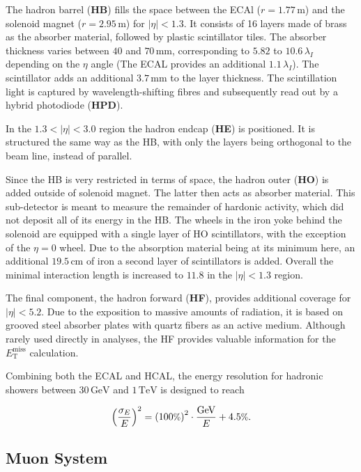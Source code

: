 The hadron barrel (\textbf{HB}) fills the space between the ECAl ($r = 1.77\,\text{m}$) and the solenoid magnet ($r = 2.95\,\text{m}$) for $|\eta| < 1.3$. It consists of 16 layers made of brass as the absorber material, followed by plastic scintillator tiles. The absorber thickness varies between $40$ and $70\,\text{mm}$, corresponding to $5.82$ to $10.6\,\lambda_I$ depending on the $\eta$ angle (The ECAL provides an additional $1.1\,\lambda_I$). The scintillator adds an additional $3.7\,\text{mm}$ to the layer thickness. The scintillation light is captured by wavelength-shifting fibres and subsequently read out by a hybrid photodiode (\textbf{HPD}).

In the $1.3 < |\eta| < 3.0$ region the hadron endcap (\textbf{HE}) is positioned. It is structured the same way as the HB, with only the layers being orthogonal to the beam line, instead of parallel.

Since the HB is very restricted in terms of space, the hadron outer (\textbf{HO}) is added outside of solenoid magnet. The latter then acts as absorber material. This sub-detector is meant to measure the remainder of hardonic activity, which did not deposit all of its energy in the HB. The wheels in the iron yoke behind the solenoid are equipped with a single layer of HO scintillators, with the exception of the $\eta = 0$ wheel. Due to the absorption material being at its minimum here, an additional $19.5\,\text{cm}$ of iron a second layer of scintillators is added. Overall the minimal interaction length is increased to $11.8$ in the $|\eta| < 1.3$ region.

The final component, the hadron forward (\textbf{HF}), provides additional coverage for $|\eta| < 5.2$. Due to the exposition to massive amounts of radiation, it is based on grooved steel absorber plates with quartz fibers as an active medium. Although rarely used directly in analyses, the HF provides valuable information for the $E^{\text{miss}}_{\text{T}}$ calculation.

Combining both the ECAL and HCAL, the energy resolution for hadronic showers between $30\,\text{GeV}$ and $1\,\text{TeV}$ is designed to reach~\cite{hcalreso}

\begin{equation}
  \label{eq:hcalreso}
  \left( \frac{\sigma_E}{E} \right)^2 = \left( 100\pct \right)^2 \cdot \frac{\text{GeV}}{E} + 4.5\pct.
\end{equation}


\subsection{Muon System}
\label{sec:muon-system}

